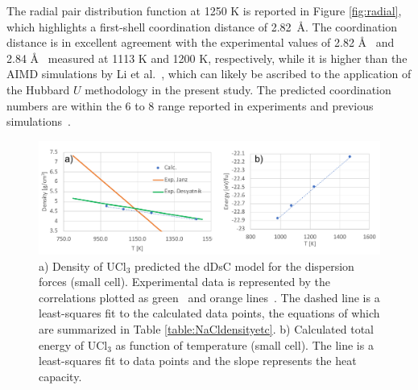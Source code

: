 \documentclass[titlepage=firstiscover,11pt,fleqn,headheight=14pt,footheight=40.8pt]{scrreprt}
\begin{document}
The radial pair distribution function at 1250 K is reported in Figure \ref{fig:radial}, which highlights a first-shell coordination distance of 2.82~\AA. The coordination distance is in excellent agreement with the experimental values of 2.82 \AA~\cite{Neilson} and 2.84 \AA~\cite{Okamoto} measured at 1113 K and 1200 K, respectively, while it is higher than the AIMD simulations by Li et al.~\cite{Li}, which can likely be ascribed to the application of the Hubbard $U$ methodology in the present study. The predicted coordination numbers are within the 6 to 8 range reported in experiments and previous simulations~\cite{Li,Neilson,Okamoto}. %
 

\begin{figure}[htb]
\centering
\includegraphics[width=1.00\textwidth]{FIG4.pdf}
\caption{a) Density of UCl$_3$ predicted the dDsC model for the dispersion forces (small cell). Experimental data is represented by the correlations plotted as green~\cite{Desyatnik} and orange lines~\cite{Janz1988}. The dashed line is a least-squares fit to the calculated data points, the equations of which are summarized in Table \ref{table:NaCldensityetc}. b) Calculated total energy of UCl$_3$ as function of temperature (small cell). The line is a least-squares fit to data points and the slope represents the heat capacity.} 
\label{fig:UCl3density}
\end{figure}
\end{document}
